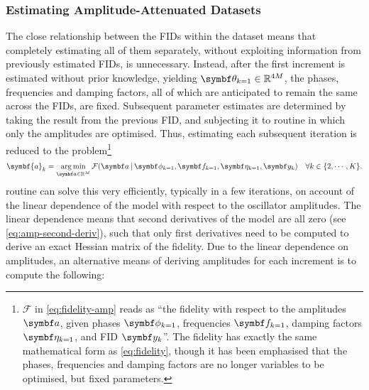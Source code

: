 \subsubsection{Estimating Amplitude-Attenuated Datasets}
The close relationship between the \acp{FID} within the dataset means that
completely estimating all of them separately, without exploiting information
from previously estimated \acp{FID}, is unnecessary.
Instead, after the first increment is estimated without prior knowledge,
yielding $\bth_{k=1} \in \mathbb{R}^{4M}$, the phases, frequencies and damping
factors, all of which are anticipated to remain the same across the
\acp{FID}, are fixed.
Subsequent parameter estimates are determined by taking the result from
the previous \ac{FID}, and subjecting it to  routine in which only
the amplitudes are optimised. Thus, estimating each subsequent iteration
is reduced to the problem\footnote{
    $\mathcal{F}$ in \cref{eq:fidelity-amp} reads as ``the fidelity
    with respect to the amplitudes $\bda$, given phases $\bdphi_{k=1}$,
    frequencies $\bdf_{k=1}$, damping factors  $\bdeta_{k=1}$, and \ac{FID}
    $\by_k$''. The fidelity has exactly the same mathematical form as
    \cref{eq:fidelity}, though it has been emphasised that the phases,
    frequencies and damping factors are no longer variables to be optimised,
    but fixed parameters.
}
\begin{equation}
    \symbf{a}_k = \argmin_{\bda \in \mathbb{R}^M}
        \mathcal{F}(\bda \hspace*{2pt} | \hspace*{2pt}
        \bdphi_{k=1}, \bdf_{k=1}, \bdeta_{k=1}, \by_k)\quad\forall k \in \lbrace2, \cdots, K\rbrace.
        \label{eq:fidelity-amp}
\end{equation}
 routine can solve this very efficiently, typically in a few
iterations, on account of the linear dependence of the model with respect to
the oscillator amplitudes. The linear dependence means that second
derivatives of the model are all zero (see \cref{eq:amp-second-deriv}),
such that only first derivatives need to be computed to derive an exact Hessian
matrix of the fidelity.
Due to the linear dependence on amplitudes, an alternative means of
deriving amplitudes for each increment is to compute the following:
